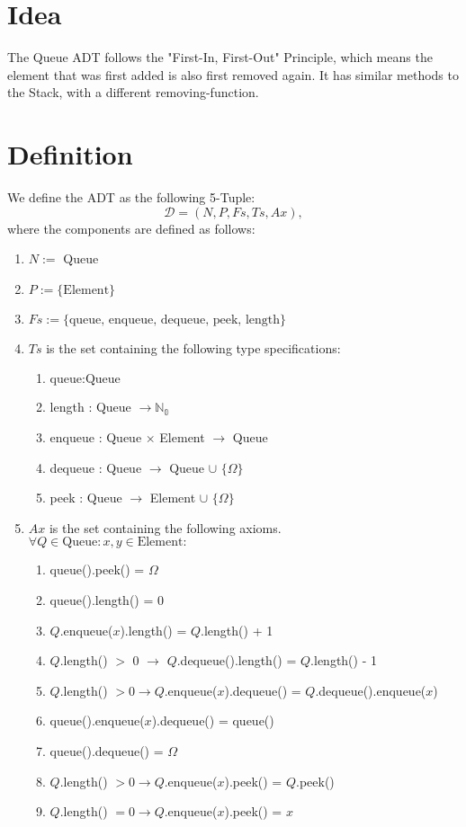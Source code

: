 \documentclass{article}
\begin{document}
\section*{Idea}
The Queue ADT follows the "First-In, First-Out" Principle, which means the element that was first added is also first removed again. It has similar methods to the Stack, with a different removing-function.


\section*{Definition}

We define the ADT as the following 5-Tuple:
\[\mathcal{D} = (N, P, Fs, Ts, Ax),\]
where the components are defined as follows:

\begin{enumerate}
 \item \(N :=\) Queue
 \item \(P := \{ \text{Element} \}\)
 \item \(Fs := \{ \text{queue, enqueue, dequeue, peek, length} \}\)
 \item \(Ts\) is the set containing the following type specifications:
	\begin{enumerate}
		\item \( \text{queue} : \text{Queue} \)
  		\item length : Queue \(\rightarrow \mathbb{N_0}\)
		\item enqueue : Queue \(\times\) Element \(\rightarrow\) Queue
		\item dequeue : Queue \(\rightarrow\) Queue \(\cup\) \(\{\Omega\}\)
		\item peek : Queue \(\rightarrow\) Element \(\cup\) \(\{\Omega\}\)
	\end{enumerate}
 \item \(Ax\) is the set containing the following axioms. \\
	\(\forall Q \in \text{Queue} : x,y \in \text{Element} :\)
	\begin{enumerate}
  \item queue().peek() = \(\Omega\)
  \item queue().length() = 0
  \item \(Q\).enqueue(\(x\)).length() = \(Q\).length() + 1
  \item \(Q\).length() \(>\) 0 \(\rightarrow\) \(Q\).dequeue().length() = \(Q\).length() - 1
  \item \(Q\).length() \(> 0 \rightarrow Q\).enqueue(\(x\)).dequeue() = \(Q\).dequeue().enqueue(\(x\))
  \item queue().enqueue(\(x\)).dequeue() = queue()
  \item queue().dequeue() = \(\Omega\)
  \item \(Q\).length() \(> 0 \rightarrow Q\).enqueue(\(x\)).peek() = \(Q\).peek()
  \item \(Q\).length() \(= 0 \rightarrow Q\).enqueue(\(x\)).peek() = \(x\)
	\end{enumerate}
\end{enumerate}
\end{document}
